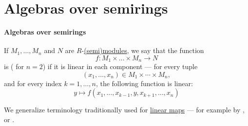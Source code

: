 \section{Algebras over semirings}\label{sec:algebras_over_semirings}

\paragraph{Algebras over semirings}

\begin{definition}\label{def:multilinear_function}\mimprovised
  If \( M_1, \ldots, M_n \) and \( N \) are \( R \)-\hyperref[def:semimodule]{(semi)modules}, we say that the function
  \begin{equation*}
    f: M_1 \times \ldots \times M_n \to N
  \end{equation*}
  is  ( for \( n = 2 \)) if it is linear in each component --- for every tuple
  \begin{equation*}
    (x_1, \ldots, x_n) \in M_1 \times \cdots \times M_n,
  \end{equation*}
  and for every index \( k = 1, \ldots, n \), the following function is linear:
  \begin{equation*}
    y \mapsto f(x_1, \ldots, x_{k-1}, y, x_{k+1}, \ldots, x_n)
  \end{equation*}
\end{definition}
\begin{comments}
  \item We generalize terminology traditionally used for \hyperref[def:linear_function]{linear maps} --- for example by ,  or .
\end{comments}


